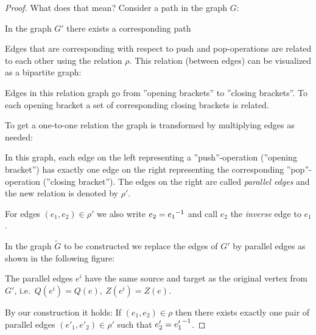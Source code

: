 \begin{proof}
What does that mean? Consider a path in the graph $G$:

\begin{center}

\end{center}

In the graph $G'$ there exists a corresponding path

\begin{center}

\end{center}

Edges that are corresponding with respect to push and pop-operations are related
to each other using the relation $\rho$. This relation (between edges) can be
visualized as a bipartite graph:

\begin{center}

\end{center}

Edges in this relation graph go from ''opening brackets'' to ''closing
brackets''. To each opening bracket a set of corresponding closing brackets is
related. 

To get a one-to-one relation the graph is transformed by multiplying edges
as needed:

\begin{center}

\end{center}

In this graph, each edge on the left representing a ''push''-operation
(''opening bracket'') has exactly one edge on the right representing the
corresponding ''pop''-operation (''closing bracket''). The edges on the right
are called {\em parallel edges} and the new relation is denoted by $\rho'$.

For edges $(e_1, e_2) \in \rho'$ we also write $e_2 = \mbox{${e_1}^{-1}$}$ and call $e_2$
the {\em inverse} edge to $e_1$.

In the graph $\tilde{G}$ to be constructed we replace the edges of $G'$ by
parallel edges as shown in the following figure:

\begin{center}

\end{center}

The parallel edges $e^{i}$ have the same source and target as the original
vertex from $G'$, i.e.\ $Q(e^{i}) = Q(e),\ Z(e^{i}) = Z(e)$.

By our construction it holds:
If $(e_1, e_2) \in \rho$ then there exists exactly one pair of parallel edges $(e'_1, e'_2)  \in \rho'$ such that $e'_2 =
\mbox{${e'_1}^{-1}$}$.


\end{proof}
